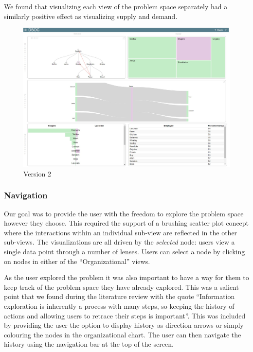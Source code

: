 \documentclass[journal]{vgtc}                %
\begin{document}
We found that visualizing each view of the problem space separately had a similarly positive effect as visualizing supply and demand. 

\begin{figure}
	\centering
	\includegraphics[width=\columnwidth]{pictures/version2.jpg}
	\caption{Version 2}
	\label{fig:version2}
\end{figure}

\subsubsection{Navigation}



Our goal was to provide the user with the freedom to explore the problem space however they choose.  This required the support of a brushing scatter plot concept where the interactions within an individual sub-view are reflected in the other sub-views. The visualizations are all driven by the \emph{selected} node: users view a single data point through a number of lenses. Users can select a node by clicking on nodes in either of the ``Organizational'' views. 

As the user explored the problem it was also important to have a way for them to keep track of the problem space they have already explored.  This was a salient point that we found during the literature review with the quote ``Information exploration is inherently a process with many steps, so keeping the history of actions and allowing users to retrace their steps is important''\cite{anafigueiras}.  This was included by providing the user the option to display history as direction arrows or simply colouring the nodes in the organizational chart.  The user can then navigate the history using the navigation bar at the top of the screen.
\end{document}
